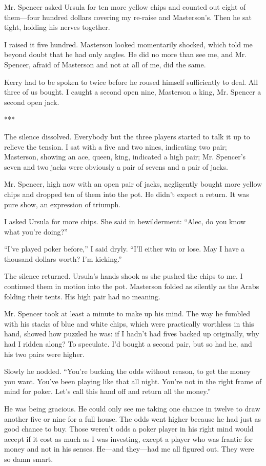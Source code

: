 \documentclass{novel}
\begin{document}
{Mr. Spencer asked Ursula for ten more yellow chips and counted out eight of them—four hundred dollars covering my re-raise and Masterson’s. Then he sat tight, holding his nerves together.

I raised it five hundred. Masterson looked momentarily shocked, which told me beyond doubt that he had only angles. He did no more than see me, and Mr. Spencer, afraid of Masterson and not at all of me, did the same.

Kerry had to be spoken to twice before he roused himself sufficiently to deal. All three of us bought. I caught a second open nine, Masterson a king, Mr. Spencer a second open jack.

***

The silence dissolved. Everybody but the three players started to talk it up to relieve the tension. I sat with a five and two nines, indicating two pair; Masterson, showing an ace, queen, king, indicated a high pair; Mr. Spencer’s seven and two jacks were obviously a pair of sevens and a pair of jacks.

Mr. Spencer, high now with an open pair of jacks, negligently bought more yellow chips and dropped ten of them into the pot. He didn’t expect a return. It was pure show, an expression of triumph.

I asked Ursula for more chips. She said in bewilderment: “Alec, do you know what you’re doing?”

“I’ve played poker before,” I said dryly. “I’ll either win or lose. May I have a thousand dollars worth? I’m kicking.”

The silence returned. Ursula’s hands shook as she pushed the chips to me. I continued them in motion into the pot. Masterson folded as silently as the Arabs folding their tents. His high pair had no meaning.

Mr. Spencer took at least a minute to make up his mind. The way he fumbled with his stacks of blue and white chips, which were practically worthless in this hand, showed how puzzled he was: if I hadn’t had fives backed up originally, why had I ridden along? To speculate. I’d bought a second pair, but so had he, and his two pairs were higher.

Slowly he nodded. “You’re bucking the odds without reason, to get the money you want. You’ve been playing like that all night. You’re not in the right frame of mind for poker. Let’s call this hand off and return all the money.”

He was being gracious. He could only see me taking one chance in twelve to draw another five or nine for a full house. The odds went higher because he had just as good chance to buy. Those weren’t odds a poker player in his right mind would accept if it cost as much as I was investing, except a player who was frantic for money and not in his senses. He—and they—had me all figured out. They were so damn smart.

}
\end{document}
